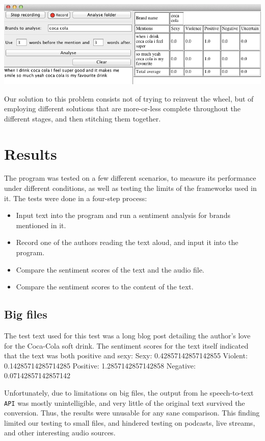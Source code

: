 \documentclass[a4paper,12pt,twoside]{ltxdoc}
\begin{document}
\begin{center}
\includegraphics[scale=0.6]{../poster/screenshot_crop.png}
\end{center}

Our solution to this problem consists not of trying to reinvent the wheel, but of employing different
solutions that are more-or-less complete throughout the different stages, and then stitching them together.

\section{Results}
The program was tested on a few different scenarios, to measure its performance under different conditions, as well as testing the limits of the frameworks used in it. The tests were done in a four-step process:

\begin{itemize}
\item Input text into the program and run a sentiment analysis for brands mentioned in it.
\item Record one of the authors reading the text aloud, and input it into the program.
\item Compare the sentiment scores of the text and the audio file.
\item Compare the sentiment scores to the content of the text.
\end{itemize}

\subsection{Big files}
The test text used for this test was a long blog post detailing the author's love for the Coca-Cola soft drink. The sentiment scores for the text itself indicated that the text was both positive and sexy:
Sexy: 0.42857142857142855 Violent: 0.14285714285714285 Positive: 1.2857142857142858 Negative: 0.07142857142857142


Unfortunately, due to limitations on big files, the output from he speech-to-text \verb#API# was mostly unintelligible, and very little of the original text survived the conversion. Thus, the results were unusable for any sane comparison. This finding limited our testing to small files, and hindered testing on podcasts, live streams, and other interesting audio sources.
\end{document}
